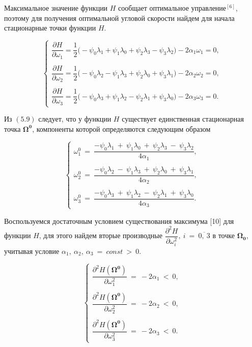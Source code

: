 \documentclass[14pt]{extreport}
\begin{document}
Максимальное значение функции $H$ сообщает оптимальное управление$^{[6]}$, поэтому для получения оптимальной угловой скорости найдем
для начала стационарные точки функции $H$.

\begin{equation}
\begin{cases}
 \dfrac{\partial H}{\partial \omega_1} = \dfrac{1}{2}\big(- \psi_0\lambda_1 + \psi_1\lambda_0 + \psi_2\lambda_3 - \psi_3\lambda_2 \big) - 2\alpha_1\omega_1 = 0, \\ \\
 \dfrac{\partial H}{\partial \omega_2} = \dfrac{1}{2}\big(- \psi_0\lambda_2 - \psi_1\lambda_3 + \psi_2\lambda_0 + \psi_3\lambda_1 \big) - 2\alpha_2\omega_2 = 0, \\ \\
 \dfrac{\partial H}{\partial \omega_3} = \dfrac{1}{2}\big(- \psi_0\lambda_3 + \psi_1\lambda_2 - \psi_2\lambda_1 + \psi_3\lambda_0 \big) - 2\alpha_3\omega_3 = 0.
 \end{cases}
\end{equation}


Из $(5.9)$ следует, что у функции $H$ существует единственная стационарная точка $\boldsymbol{\Omega^0}$, компоненты которой определяются следующим образом

\begin{equation}
\label{5.10}
\begin{cases}
\omega_1^0\ =\ \dfrac{- \psi_0\lambda_1\ +\ \psi_1\lambda_0\ +\ \psi_2\lambda_3\ -\ \psi_3\lambda_2}{4\alpha_1}, \\ \\
\omega_2^0\ =\ \dfrac{- \psi_0\lambda_2\ -\ \psi_1\lambda_3\ +\ \psi_2\lambda_0\ +\ \psi_3\lambda_1}{4\alpha_2}, \\ \\
\omega_3^0\ =\ \dfrac{- \psi_0\lambda_3\ +\ \psi_1\lambda_2\ -\ \psi_2\lambda_1\ +\ \psi_3\lambda_0}{4\alpha_3}.
 \end{cases}
\end{equation}

Воспользуемся достаточным условием существования максимума [10] для функции $H$, для этого найдем вторые производные
$\dfrac{\partial^2 H}{\partial \omega_i^2},\ i\ =\ \overline{0,\ 3}$ в точке $\boldsymbol{\Omega_0}$,
учитывая условие $\alpha_1,\ \alpha_2,\ \alpha_3\ =\ const\ >\ 0$.

\begin{equation}
\begin{cases}
\dfrac{\partial^2 H(\boldsymbol{\Omega^0})}{\partial \omega_1^2}\ =\ - 2\alpha_1\ <\ 0, \\ \\
\dfrac{\partial^2 H(\boldsymbol{\Omega^0})}{\partial \omega_2^2}\ =\ - 2\alpha_2\ <\ 0, \\ \\
\dfrac{\partial^2 H(\boldsymbol{\Omega^0})}{\partial \omega_3^2}\ =\ - 2\alpha_3\ <\ 0.
 \end{cases}
\end{equation}
\end{document}
